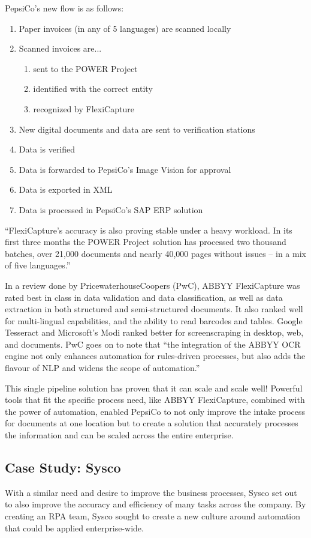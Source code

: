 \documentclass[conference, draftcls]{IEEEtran}
\begin{document}
PepsiCo's new flow is as follows:
\begin{enumerate}
\item Paper invoices (in any of 5 languages) are scanned locally
\item Scanned invoices are...
    \begin{enumerate}
        \item sent to the POWER Project
        \item identified with the correct entity
        \item recognized by FlexiCapture
    \end{enumerate}
\item New digital documents and data are sent to verification stations
\item Data is verified
\item Data is forwarded to PepsiCo's Image Vision for approval
\item Data is exported in XML
\item Data is processed in PepsiCo's SAP ERP solution
\end{enumerate}

``FlexiCapture's accuracy is also proving stable under a heavy workload. In its first three months the POWER Project solution has processed two thousand batches, over 21,000 documents and nearly 40,000 pages without issues – in a mix of five languages.'' \cite{pepsico}

In a review done by PricewaterhouseCoopers (PwC), ABBYY FlexiCapture was rated best in class in data validation and data classification, as well as data extraction in both structured and semi-structured documents. It also ranked well for multi-lingual capabilities, and the ability to read barcodes and tables. Google Tesseract and Microsoft's Modi ranked better for screenscraping in desktop, web, and documents. PwC goes on to note that ``the integration of the ABBYY OCR engine not only enhances automation for rules-driven processes, but also adds the flavour of NLP and widens the scope of automation.'' \cite{pwc2018robotic}

This single pipeline solution has proven that it can scale and scale well! Powerful tools that fit the specific process need, like ABBYY FlexiCapture, combined with the power of automation, enabled PepsiCo to not only improve the intake process for documents at one location but to create a solution that accurately processes the information and can be scaled across the entire enterprise.

\subsection{Case Study: Sysco}
With a similar need and desire to improve the business processes, Sysco set out to also improve the accuracy and efficiency of many tasks across the company. By creating an RPA team, Sysco sought to create a new culture around automation that could be applied enterprise-wide.
\end{document}
